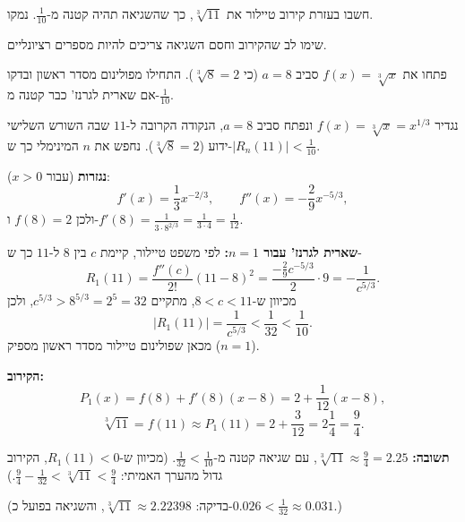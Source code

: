 
\begin{question}
חשבו בעזרת קירוב טיילור את $\sqrt[3]{11}$, כך שהשגיאה תהיה קטנה מ-$\frac{1}{10}$. נמקו.

שימו לב שהקירוב וחסם השגיאה צריכים להיות מספרים רציונליים.
\end{question}

\begin{hint}
פתחו את $f(x) = \sqrt[3]{x}$ סביב $a = 8$ (כי $\sqrt[3]{8} = 2$). התחילו מפולינום מסדר ראשון ובדקו אם שארית לגרנז' כבר קטנה מ-$\frac{1}{10}$.
\end{hint}

\begin{solution}
נגדיר $f(x) = \sqrt[3]{x} = x^{1/3}$ ונפתח סביב $a = 8$, הנקודה הקרובה ל-$11$ שבה השורש השלישי ידוע ($\sqrt[3]{8} = 2$). נחפש את $n$ המינימלי כך ש-$|R_n(11)| < \frac{1}{10}$.

\textbf{נגזרות} (עבור $x > 0$):
\[ f'(x) = \frac13 x^{-2/3}, \qquad f''(x) = -\frac29 x^{-5/3}, \]
ולכן $f(8) = 2$ ו-$f'(8) = \frac{1}{3\cdot 8^{2/3}} = \frac{1}{3\cdot 4} = \frac{1}{12}$.

\textbf{שארית לגרנז' עבור $n = 1$:} לפי משפט טיילור, קיימת $c$ בין $8$ ל-$11$ כך ש-
\[ R_1(11) = \frac{f''(c)}{2!}(11 - 8)^2 = \frac{-\frac29 c^{-5/3}}{2}\cdot 9 = -\frac{1}{c^{5/3}}. \]
מכיוון ש-$8 < c < 11$, מתקיים $c^{5/3} > 8^{5/3} = 2^5 = 32$, ולכן
\[ |R_1(11)| = \frac{1}{c^{5/3}} < \frac{1}{32} < \frac{1}{10}. \]
מכאן שפולינום טיילור מסדר ראשון מספיק ($n = 1$).

\textbf{הקירוב:}
\[ P_1(x) = f(8) + f'(8)(x - 8) = 2 + \frac{1}{12}(x - 8), \]
\[ \sqrt[3]{11} = f(11) \approx P_1(11) = 2 + \frac{3}{12} = 2\frac14 = \frac94. \]

\textbf{תשובה:} $\sqrt[3]{11} \approx \frac{9}{4} = 2.25$, עם שגיאה קטנה מ-$\frac{1}{32} < \frac{1}{10}$. (מכיוון ש-$R_1(11) < 0$, הקירוב גדול מהערך האמיתי: $\frac94 - \frac{1}{32} < \sqrt[3]{11} < \frac94$.)

(בדיקה: $\sqrt[3]{11} \approx 2.22398$, והשגיאה בפועל כ-$0.026 < \frac{1}{32} \approx 0.031$.)
\end{solution}
